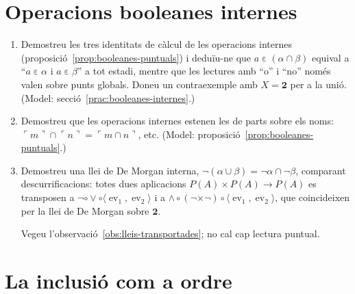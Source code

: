 \section{Operacions booleanes internes}

\begin{enumerate}[resume]
  \item Demostreu les tres identitats de càlcul de les operacions internes (proposició~\ref{prop:booleanes-puntuals}) i deduïu-ne que \(a\mathrel{\varepsilon}(\alpha\cap\beta)\) equival a \enquote{\(a\mathrel{\varepsilon}\alpha\) i \(a\mathrel{\varepsilon}\beta\)} a tot estadi, mentre que les lectures amb \enquote{o} i \enquote{no} només valen sobre punts globals. Doneu un contraexemple amb \(X=\mathbf2\) per a la unió. (Model: secció~\ref{prac:booleanes-internes}.)

  \item Demostreu que les operacions internes estenen les de parts sobre els noms: \(\ulcorner m\urcorner\cap\ulcorner n\urcorner=\ulcorner m\cap n\urcorner\), etc. (Model: proposició~\ref{prop:booleanes-puntuals}.)

  \item Demostreu una llei de De Morgan interna, \(\neg(\alpha\cup\beta)=\neg\alpha\cap\neg\beta\), comparant descurrificacions: totes dues aplicacions \(P(A)\times P(A)\to P(A)\) es transposen a \(\neg\circ\vee\circ\langle\operatorname{ev}_1,\operatorname{ev}_2\rangle\) i a \(\wedge\circ(\neg\times\neg)\circ\langle\operatorname{ev}_1,\operatorname{ev}_2\rangle\), que coincideixen per la llei de De Morgan sobre \(\mathbf2\). \begin{indicacio}Vegeu l'observació~\ref{obs:lleis-transportades}; no cal cap lectura puntual.\end{indicacio}
\end{enumerate}

\section{La inclusió com a ordre}

